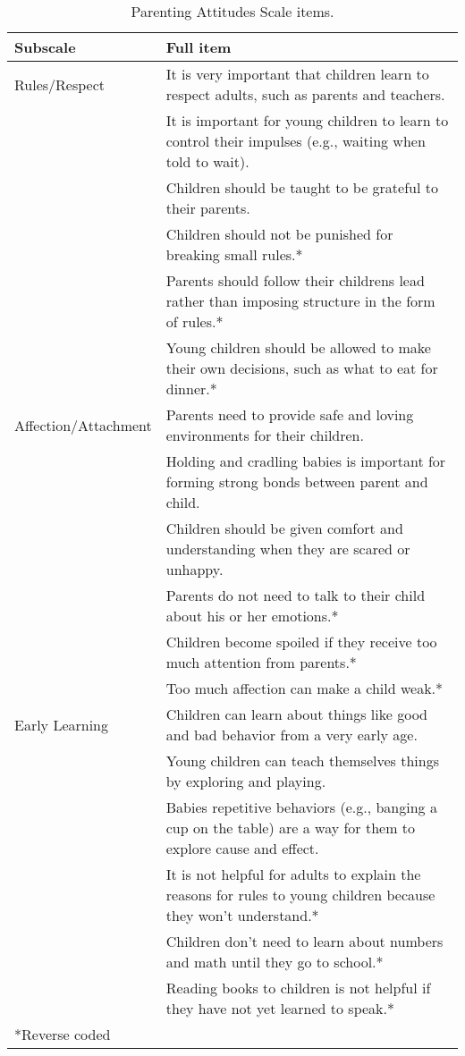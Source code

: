 \documentclass[10pt, letterpaper]{article}
\begin{document}
\begin{table*}[t]
\centering
\begin{tabular}{p{1.25in}p{5.25in}}
  \hline
Subscale & Full item \\ 
  \hline
Rules/Respect & It is very important that children learn to respect adults, such as parents and teachers. \\ 
   & It is important for young children to learn to control their impulses (e.g., waiting when told to wait). \\ 
  & Children should be taught to be grateful to their parents. \\ 
  & Children should not be punished for breaking small rules.* \\ 
  & Parents should follow their childrens lead rather than imposing structure in the form of rules.* \\ 
  & Young children should be allowed to make their own decisions, such as what to eat for dinner.* \\ 
  \hline
  Affection/Attachment & Parents need to provide safe and loving environments for their children. \\ 
   & Holding and cradling babies is important for forming strong bonds between parent and child. \\ 
   & Children should be given comfort and understanding when they are scared or unhappy. \\ 
   & Parents do not need to talk to their child about his or her emotions.* \\ 
   & Children become spoiled if they receive too much attention from parents.* \\ 
   & Too much affection can make a child weak.* \\ 
   \hline
  Early Learning & Children can learn about things like good and bad behavior from a very early age. \\ 
   & Young children can teach themselves things by exploring and playing. \\ 
   & Babies repetitive behaviors (e.g., banging a cup on the table) are a way for them to explore cause and effect. \\ 
   & It is not helpful for adults to explain the reasons for rules to young children because they won't understand.* \\ 
   & Children don't need to learn about numbers and math until they go to school.* \\ 
   & Reading books to children is not helpful if they have not yet learned to speak.* \\ 
   \hline
   *Reverse coded
\end{tabular}
\caption{Parenting Attitudes Scale items.\label{tab:items}} 
\end{table*}
\end{document}
